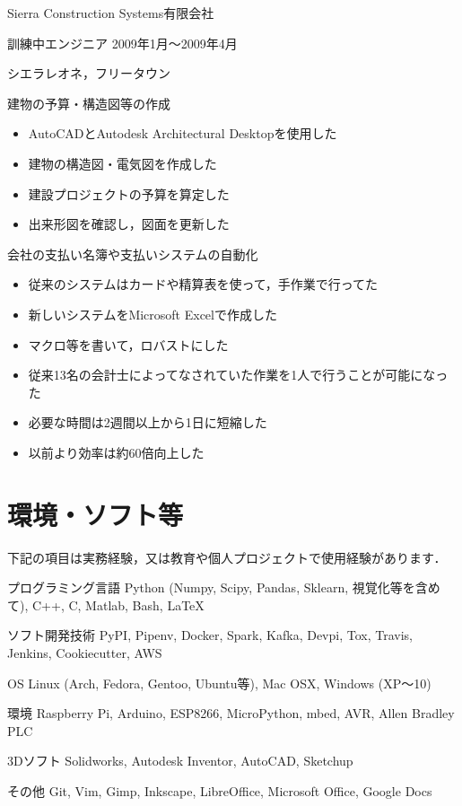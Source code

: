 \documentclass[10pt, a4paper]{article}
\begin{document}
\begin{outerlist}
\item[{\parbox[t]{3cm}{\raggedleft Sierra Construction Systems有限会社}}]{訓練中エンジニア} \hfill {2009年1月〜2009年4月}

\vspace{-\baselineskip}
\hfill シエラレオネ，フリータウン
  \begin{innerlist}
  \item 建物の予算・構造図等の作成
    \begin{itemize}
      \item AutoCADとAutodesk Architectural Desktopを使用した
      \item 建物の構造図・電気図を作成した
      \item 建設プロジェクトの予算を算定した
      \item 出来形図を確認し，図面を更新した
    \end{itemize}
  \item 会社の支払い名簿や支払いシステムの自動化
    \begin{itemize}
      \item 従来のシステムはカードや精算表を使って，手作業で行ってた
      \item 新しいシステムをMicrosoft Excelで作成した
      \item マクロ等を書いて，ロバストにした
      \item 従来13名の会計士によってなされていた作業を1人で行うことが可能になった
      \item 必要な時間は2週間以上から1日に短縮した
      \item 以前より効率は約60倍向上した
    \end{itemize}
  \end{innerlist}

\end{outerlist}

\section{環境・ソフト等}
下記の項目は実務経験，又は教育や個人プロジェクトで使用経験があります．
\begin{outerlist}
\item[プログラミング言語] Python (Numpy, Scipy, Pandas, Sklearn, 視覚化等を含めて), C++, C, Matlab, Bash, \LaTeX
\item[ソフト開発技術] PyPI, Pipenv, Docker, Spark, Kafka, Devpi, Tox, Travis, Jenkins, Cookiecutter, AWS
\item[OS] Linux (Arch, Fedora, Gentoo, Ubuntu等), Mac OSX, Windows (XP〜10)
\item[環境] Raspberry Pi, Arduino, ESP8266, MicroPython, mbed, AVR, Allen Bradley PLC
\item[3Dソフト] Solidworks, Autodesk Inventor, AutoCAD, Sketchup
\item[その他] Git, Vim, Gimp, Inkscape, LibreOffice, Microsoft Office, Google Docs
\end{outerlist}
\end{document}
